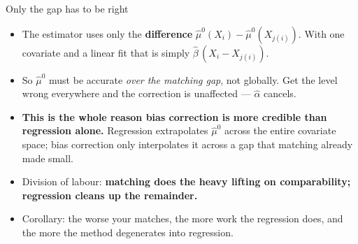 \documentclass[
  11pt,
  ignorenonframetext,
  aspectratio=169,
]{beamer}
\providecommand{\tightlist}{%
  \setlength{\itemsep}{0pt}\setlength{\parskip}{0pt}}
\begin{document}
\begin{frame}{Only the gap has to be right}
\protect{}\label{only-the-gap-has-to-be-right}
\begin{itemize}
\tightlist
\item
  The estimator uses only the \textbf{difference}
  \(\hat\mu^0(X_i) - \hat\mu^0(X_{j(i)})\). With one covariate and a
  linear fit that is simply \(\hat\beta\,(X_i - X_{j(i)})\).
\item
  So \(\hat\mu^0\) must be accurate \emph{over the matching gap}, not
  globally. Get the level wrong everywhere and the correction is
  unaffected --- \(\hat\alpha\) cancels.
\item
  \textbf{This is the whole reason bias correction is more credible than
  regression alone.} Regression extrapolates \(\hat\mu^0\) across the
  entire covariate space; bias correction only interpolates it across a
  gap that matching already made small.
\item
  Division of labour: \textbf{matching does the heavy lifting on
  comparability; regression cleans up the remainder.}
\item
  Corollary: the worse your matches, the more work the regression does,
  and the more the method degenerates into regression.
\end{itemize}
\end{frame}
\end{document}
